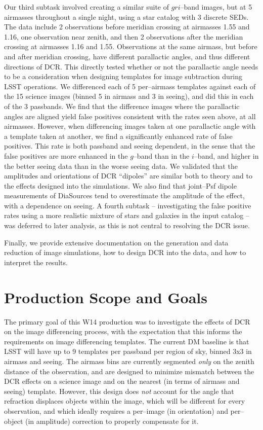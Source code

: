 \documentclass[prd, nofootinbib, floatfix, 11pt, tightenlines, times]{article}
\begin{document}
Our third subtask involved creating a similar suite of $gri$--band
images, but at 5 airmasses throughout a single night, using a star
catalog with 3 discrete SEDs.  The data include 2 observations before
meridian crossing at airmasses 1.55 and 1.16, one observation near
zenith, and then 2 observations after the meridian crossing at
airmasses 1.16 and 1.55.  Observations at the same airmass, but before
and after meridian crossing, have different parallactic angles, and
thus different directions of DCR.  This directly tested whether or not
the parallactic angle needs to be a consideration when designing
templates for image subtraction during LSST operations.  We
differenced each of 5 per--airmass templates against each of the 15
science images (binned 5 in airmass and 3 in seeing), and did this in
each of the 3 passbands.  We find that the difference images where the
parallactic angles are aligned yield false positives consistent with
the rates seen above, at all airmasses.  However, when differencing
images taken at one parallactic angle with a template taken at
another, we find a significantly enhanced rate of false positives.
This rate is both passband and seeing dependent, in the sense that the
false positives are more enhanced in the $g$--band than in the
$i$--band, and higher in the better seeing data than in the worse
seeing data.  We validated that the amplitudes and orientations of DCR
``dipoles'' are similar both to theory and to the effects designed
into the simulations.  We also find that joint--Psf dipole
measurements of DiaSources tend to overestimate the amplitude of the
effect, with a dependence on seeing.  A fourth subtask --
investigating the false positive rates using a more realistic mixture
of stars and galaxies in the input catalog -- was deferred to later
analysis, as this is not central to resolving the DCR issue.

Finally, we provide extensive documentation on the generation and data
reduction of image simulations, how to design DCR into the data, and
how to interpret the results.

\clearpage
\tableofcontents
\clearpage

\section{Production Scope and Goals}

The primary goal of this W14 production was to investigate the effects
of DCR on the image differencing process, with the expectation that
this informs the requirements on image differencing templates.  The
current DM baseline is that LSST will have up to 9 templates per
passband per region of sky, binned 3x3 in airmass and seeing.  The
airmass bins are currently segmented {\it only} on the zenith distance
of the observation, and are designed to minimize mismatch between the
DCR effects on a science image and on the nearest (in terms of airmass
and seeing) template.  However, this design does {\it not} account for
the angle that refraction displaces objects within the image, which will
be different for every observation, and which ideally requires a
per--image (in orientation) and per--object (in amplitude) correction
to properly compensate for it.
\end{document}
